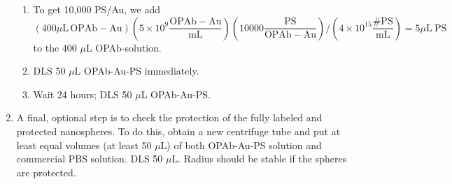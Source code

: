 \begin{enumerate}
\begin{enumerate}
\item To get 10,000 PS\slash Au, we add
\[\left(400 \mu\mathrm{L} \,\mathrm{OPAb-Au}\right)\left(5\times10^9\mathrm{\frac{OPAb-Au}{mL}}\right)\left(10000\mathrm{\frac{PS}{OPAb-Au}}\right)/\left(4\times10^{15} \mathrm{\frac{\#PS}{mL}}\right)=5\mu\mathrm{L\ PS}\]
to the 400 $\mu$L OPAb-solution.

\item DLS 50 $\mu$L OPAb-Au-PS immediately.

\item Wait 24 hours; DLS 50 $\mu$L OPAb-Au-PS.

\end{enumerate}

\item A final, optional step is to check the protection of the fully labeled and protected nanospheres. To do this, obtain a new centrifuge tube and put at least equal volumes (at least 50 $\mu$L) of both OPAb-Au-PS solution and commercial PBS solution. DLS 50 $\mu$L. Radius should be stable if the spheres are protected.

\end{enumerate}

